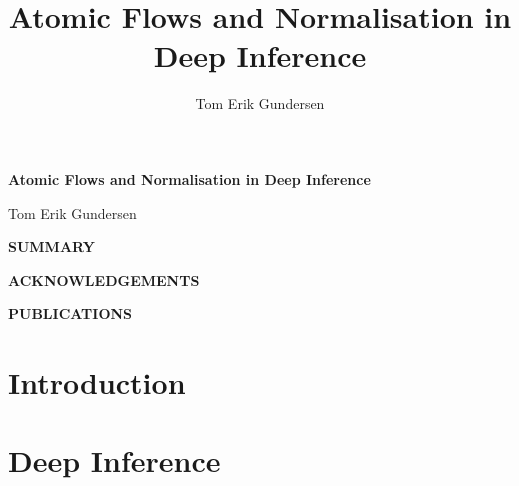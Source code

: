 \documentclass[11pt]{report}
\author{Tom Erik Gundersen}
\title{Atomic Flows and Normalisation in Deep Inference}
\begin{document}
%
%

\renewcommand{\thepage}{\roman{page}}
\maketitle

\clearpage
\thispagestyle{plain}
{\begin{center}
\vspace*{1.7cm}
{\def\baselinestretch{1.2}\Huge\bf Atomic Flows and Normalisation in Deep Inference \par}
\vspace{4cm}
{\begin{center}{\huge Tom Erik Gundersen }\end{center}}
\end{center}}

\clearpage
\thispagestyle{plain}
\begin{center}
\vspace{20pt}
  \Large\bfseries{SUMMARY}
\end{center}
%

\clearpage
\thispagestyle{plain}
\begin{center}
  {\Large\bfseries{ACKNOWLEDGEMENTS}}
\end{center}
%

\clearpage
\thispagestyle{plain}
\begin{center}
  {\Large\bfseries{PUBLICATIONS}}
\end{center}
\begin{flushleft}
%
\end{flushleft}



{
\tableofcontents 
}
\newpage
{}
\part{Introduction}

\part{Deep Inference}



\end{document}
